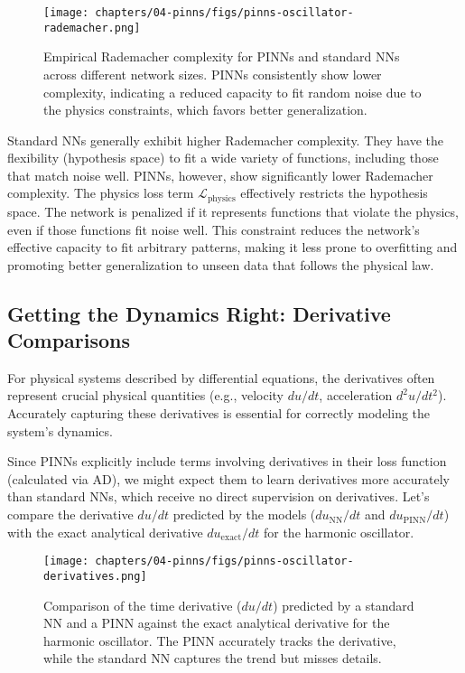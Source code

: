 \begin{figure}[htbp]
    \centering
    \texttt{[image: chapters/04-pinns/figs/pinns-oscillator-rademacher.png]}
    \caption{Empirical Rademacher complexity for PINNs and standard NNs across different network sizes. PINNs consistently show lower complexity, indicating a reduced capacity to fit random noise due to the physics constraints, which favors better generalization.}
    \label{fig:rademacher}
\end{figure}

Standard NNs generally exhibit higher Rademacher complexity. They have the flexibility (hypothesis space) to fit a wide variety of functions, including those that match noise well. PINNs, however, show significantly lower Rademacher complexity. The physics loss term $\mathcal{L}_{\text{physics}}$ effectively restricts the hypothesis space. The network is penalized if it represents functions that violate the physics, even if those functions fit noise well. This constraint reduces the network's effective capacity to fit arbitrary patterns, making it less prone to overfitting and promoting better generalization to unseen data that follows the physical law.

\subsection{Getting the Dynamics Right: Derivative Comparisons}

For physical systems described by differential equations, the derivatives often represent crucial physical quantities (e.g., velocity $du/dt$, acceleration $d^2u/dt^2$). Accurately capturing these derivatives is essential for correctly modeling the system's dynamics.

Since PINNs explicitly include terms involving derivatives in their loss function (calculated via AD), we might expect them to learn derivatives more accurately than standard NNs, which receive no direct supervision on derivatives. Let's compare the derivative $du/dt$ predicted by the models ($du_{\text{NN}}/dt$ and $du_{\text{PINN}}/dt$) with the exact analytical derivative $du_{\text{exact}}/dt$ for the harmonic oscillator.

\begin{figure}[htbp]
    \centering
    \texttt{[image: chapters/04-pinns/figs/pinns-oscillator-derivatives.png]}
    \caption{Comparison of the time derivative ($du/dt$) predicted by a standard NN and a PINN against the exact analytical derivative for the harmonic oscillator. The PINN accurately tracks the derivative, while the standard NN captures the trend but misses details.}
    \label{fig:derivative_comparison}
\end{figure}

